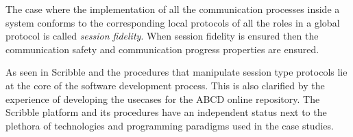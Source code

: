 The case where the implementation of all the communication
processes inside a system conforms to the corresponding
local protocols of all the roles in a global protocol
is called {\em session fidelity}.
When session fidelity is ensured then the communication safety
and communication progress properties are ensured.
%

As seen in  Scribble and the procedures
that manipulate session type protocols lie at the core
of the software development process. This is also clarified
by the experience of developing the usecases for the ABCD
online repository. The Scribble platform and its procedures
have an independent status next to the plethora of technologies and
programming paradigms used in the case studies.

%


